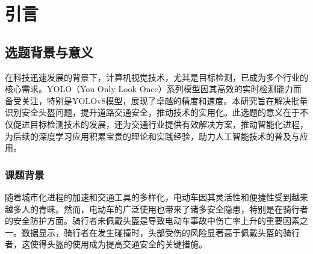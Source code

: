 \documentclass[journal]{IEEEtran}
\numberwithin{figure}{section}%
\numberwithin{table}{section}%
\numberwithin{equation}{section}
\begin{document}
\IEEEpeerreviewmaketitle

\section{引言}

\subsection{选题背景与意义}
在科技迅速发展的背景下，计算机视觉技术，尤其是目标检测，已成为多个行业的核心需求。YOLO（You Only Look Once）系列模型因其高效的实时检测能力而备受关注，特别是YOLOv8模型，展现了卓越的精度和速度。本研究旨在解决批量识别安全头盔问题，提升道路交通安全，推动技术的实用化。此选题的意义在于不仅促进目标检测技术的发展，还为交通行业提供有效解决方案，推动智能化进程，为后续的深度学习应用积累宝贵的理论和实践经验，助力人工智能技术的普及与应用。
\subsubsection{课题背景}
随着城市化进程的加速和交通工具的多样化，电动车因其灵活性和便捷性受到越来越多人的青睐。然而，电动车的广泛使用也带来了诸多安全隐患，特别是在骑行者的安全防护方面。骑行者未佩戴头盔是导致电动车事故中伤亡率上升的重要因素之一。数据显示，骑行者在发生碰撞时，头部受伤的风险显著高于佩戴头盔的骑行者，这使得头盔的使用成为提高交通安全的关键措施。\par
\end{document}
